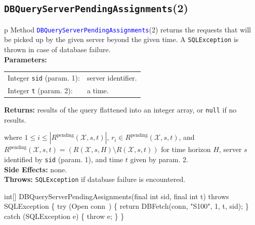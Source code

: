 \subsection{{\tt{}\protect{}DBQueryServerPendingAssignments}(2)}
\begin{tabular}{p{\textwidth}}
\toprule
{}
Method \textcolor{blue}{{\tt{}\protect{}DBQueryServerPendingAssignments}}(2) returns the
requests that will be picked up by the given server beyond the given time.
A {\tt{}SQLException} is thrown in case of database failure.\\
\midrule
\textbf{Parameters:} \\
\begin{tabular}{lp{116mm}}
Integer {\tt{}sid} (param. 1):&server identifier.\\
Integer {\tt{}t} (param. 2):&a time.\\
\end{tabular}
\textbf{Returns:} results of the query flattened into an integer array,
or {\tt{}null} if no results.


where $1\leq i\leq |R^\textrm{pending}(\mathcal{X}, s, t)|$,
$r_i\in R^\textrm{pending}(\mathcal{X}, s, t)$, and
$R^\textrm{pending}(\mathcal{X}, s, t)= (R(\mathcal{X},s,H)\setminus R(\mathcal{X},s,t))$ for
time horizon $H$, server $s$ identified by {\tt{}sid} (param. 1), and time $t$ given by param. 2.\\
\textbf{Side Effects:} none.\\
\textbf{Throws:} {\tt{}SQLException} if database failure is encountered.\\
\bottomrule
\end{tabular}
\nwenddocs{}\endmoddef{}
int[] DBQueryServerPendingAssignments(final int sid, final int t)
throws SQLException \{
  try (\LA{}Open \code{}conn\edoc{}~{\nwtagstyle{}}\RA{}) \{
    return DBFetch(conn, "S100", 1, t, sid);
  \} catch (SQLException e) \{
    throw e;
  \}
\}
\eatline
{}\nwendcode{}\nwdocspar
